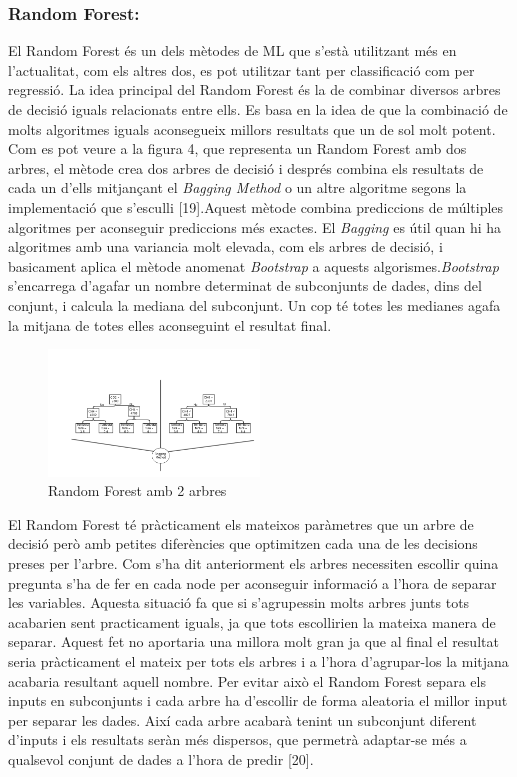 \documentclass[10pt,a4paper,twocolumn,twoside]{article}
\begin{document}
\subsubsection{Random Forest:}
El Random Forest és un dels mètodes de ML que s'està utilitzant més en l'actualitat, com els altres dos, es pot utilitzar tant per classificació com per regressió. La idea principal del Random Forest és la de combinar diversos arbres de decisió iguals relacionats entre ells. Es basa en la idea de que la combinació de molts algoritmes iguals aconsegueix millors resultats que un de sol molt potent. Com es pot veure a la figura 4, que representa un Random Forest amb dos arbres, el mètode crea dos arbres de decisió i després combina els resultats de cada un d'ells mitjançant el \textit{Bagging Method} o un altre algoritme segons la implementació que s'esculli [19].Aquest mètode combina prediccions de múltiples algoritmes per aconseguir prediccions més exactes. El \textit{Bagging} es útil quan hi ha algoritmes amb una variancia molt elevada, com els arbres de decisió, i basicament aplica el mètode anomenat \textit{Bootstrap} a aquests algorismes.\textit{Bootstrap} s'encarrega d'agafar un nombre determinat de subconjunts de dades, dins del conjunt, i calcula la mediana del subconjunt. Un cop té totes les medianes agafa la mitjana de totes elles aconseguint el resultat final. 
\begin{figure}[!h]
\centering
	\includegraphics[width=0.5\textwidth]{../img/randomForest}
	\caption{Random Forest amb 2 arbres}
	\label{fig-RandomForest}
\end{figure}

El Random Forest té pràcticament els mateixos paràmetres que un arbre de decisió però amb petites diferències que optimitzen cada una de les decisions preses per l'arbre. Com s'ha dit anteriorment els arbres necessiten escollir quina pregunta s'ha de fer en cada node per aconseguir informació a l'hora de separar les variables. Aquesta situació fa que si s'agrupessin molts arbres junts tots acabarien sent practicament iguals, ja que tots escollirien la mateixa manera de separar. Aquest fet no aportaria una millora molt gran ja que al final el resultat seria pràcticament el mateix per tots els arbres i a l'hora d'agrupar-los la mitjana acabaria resultant aquell nombre. Per evitar això el Random Forest separa els inputs en subconjunts i cada arbre ha d'escollir de forma aleatoria el millor input per separar les dades. Així cada arbre acabarà tenint un subconjunt diferent d'inputs i els resultats seràn més dispersos, que permetrà adaptar-se més a qualsevol conjunt de dades a l'hora de predir [20].
\end{document}

